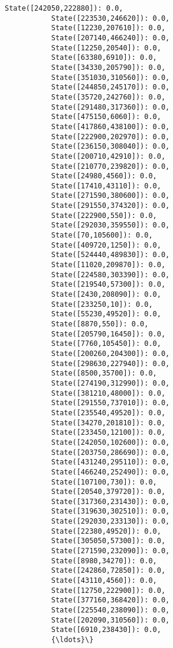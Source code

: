 \documentclass[11pt]{article}
\begin{document}
\begin{Verbatim}[commandchars=\\\{\}]
           State([242050,222880]): 0.0,
           State([223530,246620]): 0.0,
           State([12230,207610]): 0.0,
           State([207140,466240]): 0.0,
           State([12250,20540]): 0.0,
           State([63380,6910]): 0.0,
           State([34330,205790]): 0.0,
           State([351030,310560]): 0.0,
           State([244850,245170]): 0.0,
           State([35720,242760]): 0.0,
           State([291480,317360]): 0.0,
           State([475150,6060]): 0.0,
           State([417860,438100]): 0.0,
           State([222900,202970]): 0.0,
           State([236150,308040]): 0.0,
           State([200710,42910]): 0.0,
           State([210770,239820]): 0.0,
           State([24980,4560]): 0.0,
           State([17410,43110]): 0.0,
           State([271590,380600]): 0.0,
           State([291550,374320]): 0.0,
           State([222900,550]): 0.0,
           State([292030,359550]): 0.0,
           State([70,105600]): 0.0,
           State([409720,1250]): 0.0,
           State([524440,489830]): 0.0,
           State([11020,209870]): 0.0,
           State([224580,303390]): 0.0,
           State([219540,57300]): 0.0,
           State([2430,208090]): 0.0,
           State([233250,10]): 0.0,
           State([55230,49520]): 0.0,
           State([8870,550]): 0.0,
           State([205790,16450]): 0.0,
           State([7760,105450]): 0.0,
           State([200260,204300]): 0.0,
           State([298630,227940]): 0.0,
           State([8500,35700]): 0.0,
           State([274190,312990]): 0.0,
           State([381210,48000]): 0.0,
           State([291550,737010]): 0.0,
           State([235540,49520]): 0.0,
           State([34270,201810]): 0.0,
           State([233450,12100]): 0.0,
           State([242050,102600]): 0.0,
           State([203750,286690]): 0.0,
           State([431240,295110]): 0.0,
           State([466240,252490]): 0.0,
           State([107100,730]): 0.0,
           State([20540,379720]): 0.0,
           State([317360,231430]): 0.0,
           State([319630,302510]): 0.0,
           State([292030,233130]): 0.0,
           State([22380,49520]): 0.0,
           State([305050,57300]): 0.0,
           State([271590,232090]): 0.0,
           State([8980,34270]): 0.0,
           State([242860,72850]): 0.0,
           State([43110,4560]): 0.0,
           State([12750,222900]): 0.0,
           State([377160,368420]): 0.0,
           State([225540,238090]): 0.0,
           State([202090,310560]): 0.0,
           State([6910,238430]): 0.0,
           {\ldots}\}
\end{Verbatim}
            
\end{document}
